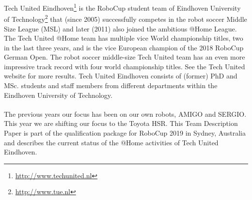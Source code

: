 Tech United Eindhoven\footnote{\url{http://www.techunited.nl}} is the RoboCup student team of Eindhoven University of Technology\footnote{\url{http://www.tue.nl}} that (since 2005) successfully competes in the robot soccer Middle Size League (MSL) and later (2011) also joined the ambitious @Home League. The Tech United @Home team has multiple vice World championship titles, two in the last three years, and is the vice European champion of the 2018 RoboCup German Open. The robot soccer middle-size Tech United team has an even more impressive track record with four world championship titles. See the Tech United website for more results. Tech United Eindhoven consists of (former) PhD and MSc. students and staff members from different departments within the Eindhoven University of Technology.
\\\\
The previous years our focus has been on our own robots, AMIGO and SERGIO. This year we are shifting our focus to the Toyota HSR.
This Team Description Paper is part of the qualification package for RoboCup 2019 in Sydney, Australia and describes the current status of the @Home activities of Tech United Eindhoven.

